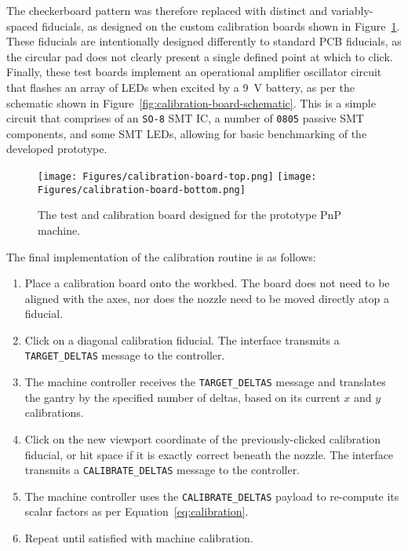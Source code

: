 \documentclass[12pt,british,UKenglish]{article}
\begin{document}
The checkerboard pattern was therefore replaced with distinct and variably-spaced fiducials, as designed on the custom calibration boards shown in Figure~\ref{fig:calibration-board}.
These fiducials are intentionally designed differently to standard \ac{PCB} fiducials, as the circular pad does not clearly present a single defined point at which to click.
Finally, these test boards implement an operational amplifier oscillator circuit that flashes an array of \acp{LED} when excited by a \qty{9}{\volt} battery, as per the schematic shown in Figure~\ref{fig:calibration-board-schematic}.
This is a simple circuit that comprises of an \texttt{SO-8} \ac{SMT} \acf{IC}, a number of \texttt{0805} passive \ac{SMT} components, and some \ac{SMT} \acp{LED}, allowing for basic benchmarking of the developed prototype.
\begin{figure}[hbtp]
    \texttt{[image: Figures/calibration-board-top.png]}
    \texttt{[image: Figures/calibration-board-bottom.png]}
    \centering
    \caption{The test and calibration board designed for the prototype \ac{PnP} machine.}
    \label{fig:calibration-board}
\end{figure}

The final implementation of the calibration routine is as follows:

\begin{enumerate}
    \item Place a calibration board onto the workbed.
          The board does not need to be aligned with the axes, nor does the nozzle need to be moved directly atop a fiducial.
    \item Click on a diagonal calibration fiducial.
          The interface transmits a \texttt{TARGET\_DELTAS} message to the controller.
    \item The machine controller receives the \texttt{TARGET\_DELTAS} message and translates the gantry by the specified number of deltas, based on its current $x$ and $y$ calibrations.
    \item Click on the new viewport coordinate of the previously-clicked calibration fiducial, or hit space if it is exactly correct beneath the nozzle.
          The interface transmits a \texttt{CALIBRATE\_DELTAS} message to the controller.
    \item The machine controller uses the \texttt{CALIBRATE\_DELTAS} payload to re-compute its scalar factors as per Equation~\eqref{eq:calibration}.
    \item Repeat until satisfied with machine calibration.
\end{enumerate}
\end{document}
